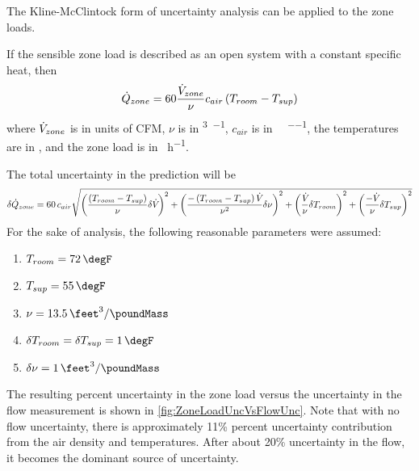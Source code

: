 The Kline-McClintock form of uncertainty analysis can be applied to the
zone loads.

If the sensible zone load is described as an open system with a constant specific
heat, then
\begin{equation}
    \dot{Q}_{zone} = 60 \frac{\dot{V}_{zone}}{\nu} c_{air} \left(T_{room} -
    T_{sup}\right)
\end{equation}
where \(\dot{V}_{zone}\) is in units of CFM, \(\nu\) is in
\si{\feet\cubed\per\pound}, \(c_{air}\) is in
\si{\btu\per\pound\per\degreeF}, the temperatures are in
\si{\degreeF}, and the zone load is in \si{\btu\per\hour}.

The total uncertainty in the prediction will be
\begin{equation}
    \delta \dot{Q}_{zone} = 60\,c_{air} \sqrt{ \left( \frac{\left(T_{room} - T_{sup}\right)}{\nu} \delta \dot{V}_{} \right)^2 
    + \left( \frac{- \left(T_{room} - T_{sup}\right) \dot{V}_{}}{\nu^{2}} \delta \nu \right)^{2}  
+ \left( \frac{\dot{V}_{}}{\nu} \delta T_{room}\right)^{2}
+ \left(\frac{-\dot{V}_{}}{\nu} \delta T_{sup}\right)^{2}
}
\end{equation}
For the sake of analysis, the following reasonable parameters were assumed:
\begin{enumerate}
    \item \(T_{room} = \SI{72}{\degF} \)
    \item \(T_{sup} = \SI{55}{\degF} \)
    \item \(\nu = \SI{13.5}{\feet\cubed\per\poundMass}\)
    \item \(\delta T_{room} = \delta T_{sup} = \SI{1}{\degF}\)
    \item \( \delta \nu = \SI{1}{\feet\cubed\per\poundMass} \)
\end{enumerate}

The resulting percent uncertainty in the zone load versus the
uncertainty in the flow measurement is shown in \figref{}
\ref{fig:ZoneLoadUncVsFlowUnc}. Note that with no flow
uncertainty, there is approximately 11\% percent uncertainty
contribution from the air density and temperatures. After about 20\%
uncertainty in the flow, it becomes the dominant source of uncertainty. 



